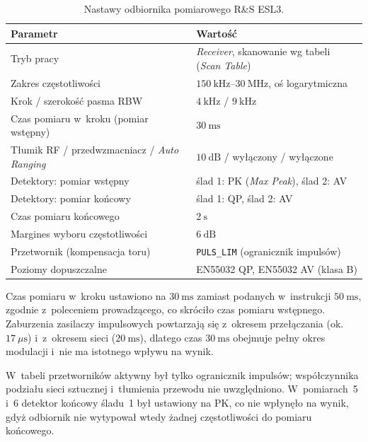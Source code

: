 \documentclass[11pt,a4paper]{article}
\begin{document}
\begin{table}[H]
  \centering
  \small
  \caption{Nastawy odbiornika pomiarowego R\&S ESL3.}
  \label{tab:nastawy}
  \renewcommand{\arraystretch}{1.15}
  \begin{tabular}{|l|l|}
    \hline
    \textbf{Parametr} & \textbf{Wartość} \\
    \hline
    Tryb pracy                         & \emph{Receiver}, skanowanie wg tabeli (\emph{Scan Table}) \\
    \hline
    Zakres częstotliwości              & $150\ \mathrm{kHz}$--$30\ \mathrm{MHz}$, oś logarytmiczna \\
    \hline
    Krok / szerokość pasma RBW         & $4\ \mathrm{kHz}$ / $9\ \mathrm{kHz}$ \\
    \hline
    Czas pomiaru w~kroku (pomiar wstępny) & $30\ \mathrm{ms}$ \\
    \hline
    Tłumik RF / przedwzmacniacz / \emph{Auto Ranging} & $10\ \mathrm{dB}$ / wyłączony / wyłączone \\
    \hline
    Detektory: pomiar wstępny          & ślad 1: PK (\emph{Max Peak}), ślad 2: AV \\
    \hline
    Detektory: pomiar końcowy          & ślad 1: QP, ślad 2: AV \\
    \hline
    Czas pomiaru końcowego             & $2\ \mathrm{s}$ \\
    \hline
    Margines wyboru częstotliwości     & $6\ \mathrm{dB}$ \\
    \hline
    Przetwornik (kompensacja toru)     & \texttt{PULS\_LIM} (ogranicznik impulsów) \\
    \hline
    Poziomy dopuszczalne               & EN55032 QP, EN55032 AV (klasa B) \\
    \hline
  \end{tabular}
\end{table}

Czas pomiaru w~kroku ustawiono na $30\ \mathrm{ms}$ zamiast podanych w~instrukcji
$50\ \mathrm{ms}$, zgodnie z~poleceniem prowadzącego, co skróciło czas pomiaru wstępnego. Zaburzenia
zasilaczy impulsowych powtarzają się z~okresem przełączania (ok.~$17\ \mu\mathrm{s}$) i~z~okresem
sieci ($20\ \mathrm{ms}$), dlatego czas $30\ \mathrm{ms}$ obejmuje pełny okres modulacji i~nie ma
istotnego wpływu na wynik.

W~tabeli przetworników aktywny był tylko ogranicznik impulsów; współczynnika podziału sieci
sztucznej i~tłumienia przewodu nie uwzględniono. W~pomiarach~5 i~6 detektor końcowy śladu~1
był ustawiony na PK, co nie wpłynęło na wynik, gdyż odbiornik nie wytypował wtedy żadnej
częstotliwości do pomiaru końcowego.
\end{document}
